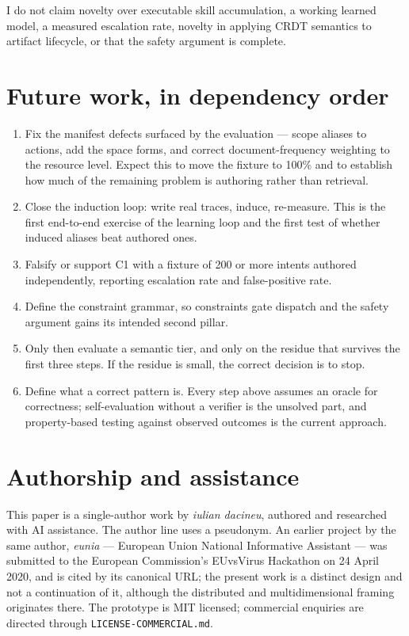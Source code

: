 \documentclass[11pt,twocolumn]{article}
\begin{document}
I do not claim novelty over executable skill accumulation, a working learned
model, a measured escalation rate, novelty in applying CRDT semantics to
artifact lifecycle, or that the safety argument is complete.

\section{Future work, in dependency order}

\begin{enumerate}
\item Fix the manifest defects surfaced by the evaluation --- scope aliases to
      actions, add the space forms, and correct document-frequency weighting to
      the resource level. Expect this to move the fixture to 100\% and to
      establish how much of the remaining problem is authoring rather than
      retrieval.
\item Close the induction loop: write real traces, induce, re-measure. This is
      the first end-to-end exercise of the learning loop and the first test of
      whether induced aliases beat authored ones.
\item Falsify or support C1 with a fixture of 200 or more intents authored
      independently, reporting escalation rate and false-positive rate.
\item Define the constraint grammar, so constraints gate dispatch and the safety
      argument gains its intended second pillar.
\item Only then evaluate a semantic tier, and only on the residue that survives
      the first three steps. If the residue is small, the correct decision is to
      stop.
\item Define what a correct pattern is. Every step above assumes an oracle for
      correctness; self-evaluation without a verifier is the unsolved part, and
      property-based testing against observed outcomes is the current approach.
\end{enumerate}

\section*{Authorship and assistance}

This paper is a single-author work by \textit{iulian dacineu}, authored and
researched with AI assistance. The author line uses a pseudonym. An earlier
project by the same author, \emph{eunia} --- European Union National Informative
Assistant --- was submitted to the European Commission's EUvsVirus Hackathon on
24 April 2020, and is cited by its canonical URL; the present work is a distinct
design and not a continuation of it, although the distributed and
multidimensional framing originates there. The prototype is MIT licensed;
commercial enquiries are directed through \texttt{LICENSE-COMMERCIAL.md}.
\end{document}
